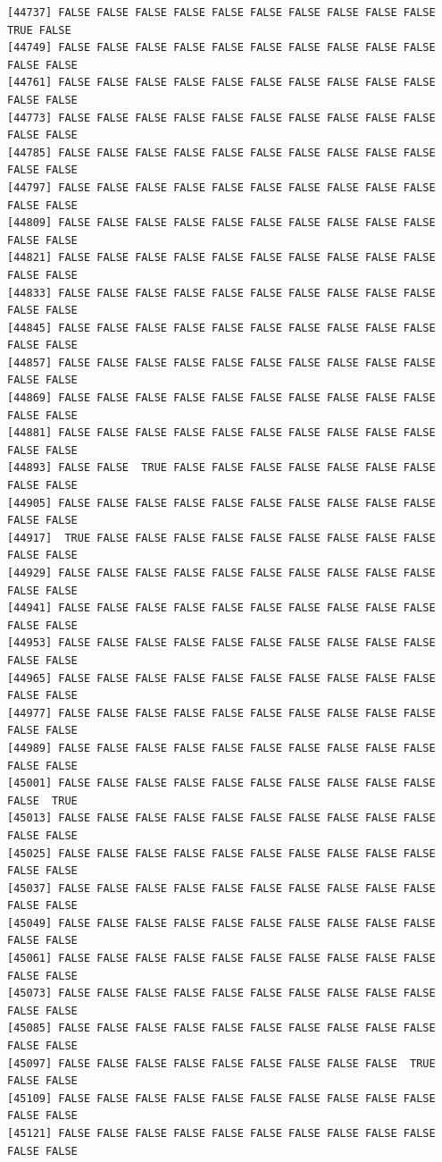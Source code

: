 \documentclass[
  a4paper,
  DIV=11,
  numbers=noendperiod]{scrartcl}
\begin{document}
\begin{verbatim}
[44737] FALSE FALSE FALSE FALSE FALSE FALSE FALSE FALSE FALSE FALSE  TRUE FALSE
[44749] FALSE FALSE FALSE FALSE FALSE FALSE FALSE FALSE FALSE FALSE FALSE FALSE
[44761] FALSE FALSE FALSE FALSE FALSE FALSE FALSE FALSE FALSE FALSE FALSE FALSE
[44773] FALSE FALSE FALSE FALSE FALSE FALSE FALSE FALSE FALSE FALSE FALSE FALSE
[44785] FALSE FALSE FALSE FALSE FALSE FALSE FALSE FALSE FALSE FALSE FALSE FALSE
[44797] FALSE FALSE FALSE FALSE FALSE FALSE FALSE FALSE FALSE FALSE FALSE FALSE
[44809] FALSE FALSE FALSE FALSE FALSE FALSE FALSE FALSE FALSE FALSE FALSE FALSE
[44821] FALSE FALSE FALSE FALSE FALSE FALSE FALSE FALSE FALSE FALSE FALSE FALSE
[44833] FALSE FALSE FALSE FALSE FALSE FALSE FALSE FALSE FALSE FALSE FALSE FALSE
[44845] FALSE FALSE FALSE FALSE FALSE FALSE FALSE FALSE FALSE FALSE FALSE FALSE
[44857] FALSE FALSE FALSE FALSE FALSE FALSE FALSE FALSE FALSE FALSE FALSE FALSE
[44869] FALSE FALSE FALSE FALSE FALSE FALSE FALSE FALSE FALSE FALSE FALSE FALSE
[44881] FALSE FALSE FALSE FALSE FALSE FALSE FALSE FALSE FALSE FALSE FALSE FALSE
[44893] FALSE FALSE  TRUE FALSE FALSE FALSE FALSE FALSE FALSE FALSE FALSE FALSE
[44905] FALSE FALSE FALSE FALSE FALSE FALSE FALSE FALSE FALSE FALSE FALSE FALSE
[44917]  TRUE FALSE FALSE FALSE FALSE FALSE FALSE FALSE FALSE FALSE FALSE FALSE
[44929] FALSE FALSE FALSE FALSE FALSE FALSE FALSE FALSE FALSE FALSE FALSE FALSE
[44941] FALSE FALSE FALSE FALSE FALSE FALSE FALSE FALSE FALSE FALSE FALSE FALSE
[44953] FALSE FALSE FALSE FALSE FALSE FALSE FALSE FALSE FALSE FALSE FALSE FALSE
[44965] FALSE FALSE FALSE FALSE FALSE FALSE FALSE FALSE FALSE FALSE FALSE FALSE
[44977] FALSE FALSE FALSE FALSE FALSE FALSE FALSE FALSE FALSE FALSE FALSE FALSE
[44989] FALSE FALSE FALSE FALSE FALSE FALSE FALSE FALSE FALSE FALSE FALSE FALSE
[45001] FALSE FALSE FALSE FALSE FALSE FALSE FALSE FALSE FALSE FALSE FALSE  TRUE
[45013] FALSE FALSE FALSE FALSE FALSE FALSE FALSE FALSE FALSE FALSE FALSE FALSE
[45025] FALSE FALSE FALSE FALSE FALSE FALSE FALSE FALSE FALSE FALSE FALSE FALSE
[45037] FALSE FALSE FALSE FALSE FALSE FALSE FALSE FALSE FALSE FALSE FALSE FALSE
[45049] FALSE FALSE FALSE FALSE FALSE FALSE FALSE FALSE FALSE FALSE FALSE FALSE
[45061] FALSE FALSE FALSE FALSE FALSE FALSE FALSE FALSE FALSE FALSE FALSE FALSE
[45073] FALSE FALSE FALSE FALSE FALSE FALSE FALSE FALSE FALSE FALSE FALSE FALSE
[45085] FALSE FALSE FALSE FALSE FALSE FALSE FALSE FALSE FALSE FALSE FALSE FALSE
[45097] FALSE FALSE FALSE FALSE FALSE FALSE FALSE FALSE FALSE  TRUE FALSE FALSE
[45109] FALSE FALSE FALSE FALSE FALSE FALSE FALSE FALSE FALSE FALSE FALSE FALSE
[45121] FALSE FALSE FALSE FALSE FALSE FALSE FALSE FALSE FALSE FALSE FALSE FALSE

\end{verbatim}
\end{document}
